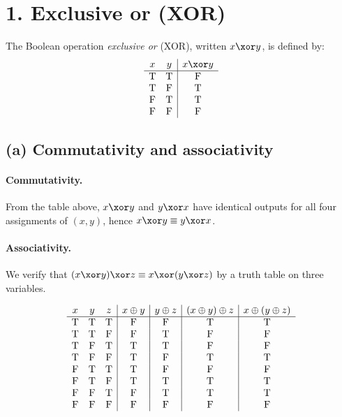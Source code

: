 \section*{1. Exclusive or (XOR)}

The Boolean operation \emph{exclusive or} (XOR), written $x \xor y$, is defined by:
\[
\begin{array}{c c | c}
x & y & x \xor y\\ \hline
\mathrm{T} & \mathrm{T} & \mathrm{F}\\
\mathrm{T} & \mathrm{F} & \mathrm{T}\\
\mathrm{F} & \mathrm{T} & \mathrm{T}\\
\mathrm{F} & \mathrm{F} & \mathrm{F}
\end{array}
\]

\subsection*{(a) Commutativity and associativity}

\paragraph{Commutativity.}
From the table above, $x \xor y$ and $y \xor x$ have identical outputs for all four
assignments of $(x,y)$, hence $x \xor y \equiv y \xor x$.

\medskip
\paragraph{Associativity.}
We verify that $(x \xor y) \xor z \equiv x \xor (y \xor z)$ by a truth table on three variables.

\[
\begin{array}{c c c | c | c | c | c}
x & y & z & x \oplus y & y \oplus z & (x \oplus y) \oplus z & x \oplus (y \oplus z)\\ \hline
\mathrm{T} & \mathrm{T} & \mathrm{T} & \mathrm{F} & \mathrm{F} & \mathrm{T} & \mathrm{T}\\
\mathrm{T} & \mathrm{T} & \mathrm{F} & \mathrm{F} & \mathrm{T} & \mathrm{F} & \mathrm{F}\\
\mathrm{T} & \mathrm{F} & \mathrm{T} & \mathrm{T} & \mathrm{T} & \mathrm{F} & \mathrm{F}\\
\mathrm{T} & \mathrm{F} & \mathrm{F} & \mathrm{T} & \mathrm{F} & \mathrm{T} & \mathrm{T}\\
\mathrm{F} & \mathrm{T} & \mathrm{T} & \mathrm{T} & \mathrm{F} & \mathrm{F} & \mathrm{F}\\
\mathrm{F} & \mathrm{T} & \mathrm{F} & \mathrm{T} & \mathrm{T} & \mathrm{T} & \mathrm{T}\\
\mathrm{F} & \mathrm{F} & \mathrm{T} & \mathrm{F} & \mathrm{T} & \mathrm{T} & \mathrm{T}\\
\mathrm{F} & \mathrm{F} & \mathrm{F} & \mathrm{F} & \mathrm{F} & \mathrm{F} & \mathrm{F}
\end{array}
\]

